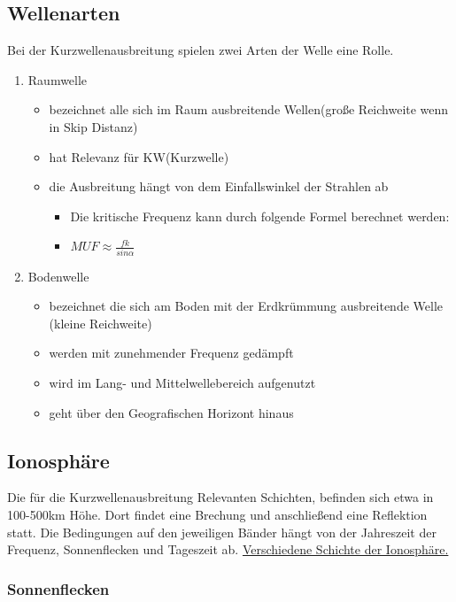 \documentclass[fontzize=12pt,paper=a4,twoside=false]{article}
\begin{document}
\subsection[]{Wellenarten}
Bei der Kurzwellenausbreitung spielen zwei Arten der Welle eine Rolle.
\begin{enumerate}
    \item Raumwelle
    \begin{itemize}
        \item bezeichnet alle sich im Raum ausbreitende Wellen(große Reichweite wenn in Skip Distanz)
        \item hat Relevanz für KW(Kurzwelle)
        \item die Ausbreitung hängt von dem Einfallswinkel der Strahlen ab
        \begin{itemize}
            \item Die kritische Frequenz kann durch folgende Formel berechnet werden:
            \item \( MUF \approx \frac{f k}{sin \alpha }\)	
        \end{itemize}
    \end{itemize}
    \item Bodenwelle
    \begin{itemize}
        \item bezeichnet die sich am Boden mit der Erdkrümmung ausbreitende Welle (kleine Reichweite)
        \item werden mit zunehmender Frequenz gedämpft
        \item wird im Lang- und Mittelwellebereich aufgenutzt
        \item geht über den Geografischen Horizont hinaus
    \end{itemize}
\end{enumerate}
\subsection[]{Ionosphäre}
Die für die Kurzwellenausbreitung Relevanten Schichten, befinden sich etwa in 100-500km Höhe.
Dort findet eine Brechung und anschließend eine Reflektion statt.
Die Bedingungen auf den jeweiligen Bänder hängt von der Jahreszeit der Frequenz, Sonnenflecken und Tageszeit ab. \newline
\href{https://www.darc.de/fileadmin/filemounts/referate/ajw/Onlinelehrgang/e09/Bild9-2.gif}{Verschiedene Schichte der Ionosphäre.}
\subsubsection[]{Sonnenflecken}
\end{document}
